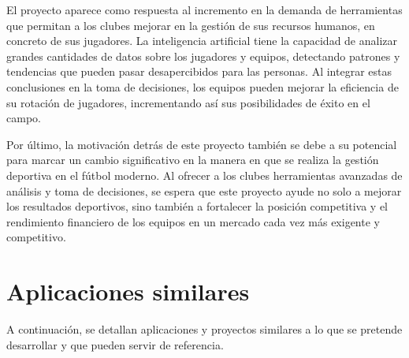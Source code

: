 El proyecto aparece como respuesta al incremento en la demanda de herramientas que permitan a los clubes mejorar en la gestión de sus recursos humanos, en concreto de sus jugadores. La inteligencia artificial tiene la capacidad de analizar grandes cantidades de datos sobre los jugadores y equipos, detectando patrones y tendencias que pueden pasar desapercibidos para las personas. Al integrar estas conclusiones en la toma de decisiones, los equipos pueden mejorar la eficiencia de su rotación de jugadores, incrementando así sus posibilidades de éxito en el campo.

Por último, la motivación detrás de este proyecto también se debe a su potencial para marcar un cambio significativo en la manera en que se realiza la gestión deportiva en el fútbol moderno. Al ofrecer a los clubes herramientas avanzadas de análisis y toma de decisiones, se espera que este proyecto ayude no solo a mejorar los resultados deportivos, sino también a fortalecer la posición competitiva y el rendimiento financiero de los equipos en un mercado cada vez más exigente y competitivo.



\section{Aplicaciones similares}

A continuación, se detallan aplicaciones y proyectos similares a lo que se pretende desarrollar y que pueden servir de referencia.

	 


